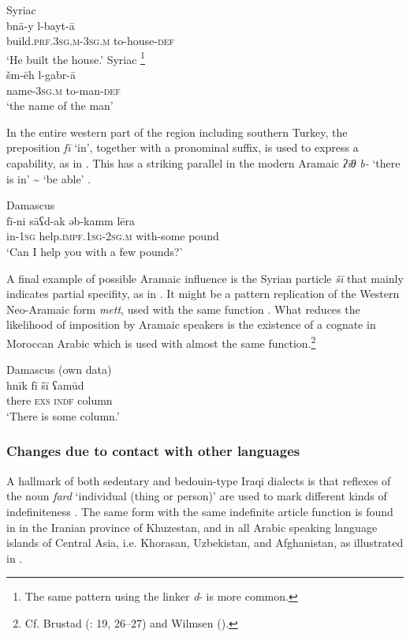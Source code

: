 \documentclass[output=paper]{langsci/langscibook}
\begin{document}
\ea\label{ex:prochazka:} \label{rubin}
\ea
{Syriac \citep[100]{Rubin2005}}\\
\gll bnā-y l-bayt-ā\\
     build.\textsc{prf.3sg.m}{}-3\textsc{sg.m} to-house-\textsc{def}\\
     \glt ‘He built the house.’
\ex
{ Syriac \citep[29]{Hopkins1997}\footnote{The same pattern using the linker \textit{d}{}- is more common.}}\\
\gll šm-ēh l-gabr-ā\\
     name-3\textsc{sg.m} to-man-\textsc{def}\\
\glt ‘the name of the man’
\z
\z

In the entire western part of the region including southern Turkey, the preposition \textit{fī} ‘in’, together with a pronominal suffix, is used to express a capability, as in . This has a striking parallel in the modern Aramaic \textit{ʔīθ} \textit{b-} ‘there is in' {\textasciitilde} `be able’ \citep[52]{Borg2004}.

\ea\label{ex:prochazka:} \label{cowell}
{Damascus \citep[415]{Cowell1964}} \\
\gll fī-ni sāʕd-ak əb-kamm lēra\\
     in-\textsc{1sg} help.\textsc{impf.1sg-2sg.m} with-some pound \\
\glt ‘Can I help you with a few pounds?’
\z

A final example of possible Aramaic influence is the Syrian particle \textit{šī} that mainly indicates partial specifity, as in . It might be a pattern replication of the Western Neo-Aramaic form \textit{mett}, used with the same function \citep[49]{Diem1979}. What reduces the likelihood of imposition by Aramaic speakers is the existence of a cognate in Moroccan Arabic which is used with almost the same function.\footnote{Cf. Brustad (\citeyear{Brustad2000}: 19, 26--27) and Wilmsen (\citeyear[51--53]{Wilmsen2014}).}

\ea\label{shi} 
{Damascus (own data)}\\
\gll hnīk fī šī ʕamūd\\
     there \textsc{exs} \textsc{indf} column \\
\glt ‘There is some column.’
\z

\subsubsection{Changes due to contact with other languages}
A hallmark of both sedentary and bedouin-type Iraqi dialects is that reflexes of the noun \textit{fard} ‘individual (thing or person)’ are used to mark different kinds of indefiniteness \citep[118--119]{Blanc1964}. The same form with the same indefinite article function is found in in the Iranian province of Khuzestan, and in all Arabic speaking language islands of Central Asia, i.e. Khorasan, Uzbekistan, and Afghanistan, as illustrated in .
\end{document}
